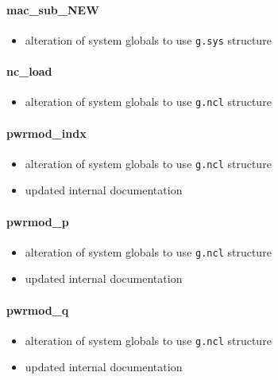 \documentclass[12pt]{article}
\begin{document}
\paragraph{mac\_sub\_NEW}
	\begin{itemize}
		\item alteration of system globals to use \verb|g.sys| structure
	\end{itemize}
\paragraph{nc\_load}
	\begin{itemize}
		\item alteration of system globals to use \verb|g.ncl| structure
	\end{itemize}
\paragraph{pwrmod\_indx}
	\begin{itemize}
		\item alteration of system globals to use \verb|g.ncl| structure
		\item updated internal documentation
	\end{itemize}
\paragraph{pwrmod\_p}
	\begin{itemize}
		\item alteration of system globals to use \verb|g.ncl| structure
		\item updated internal documentation
	\end{itemize}
\paragraph{pwrmod\_q}
	\begin{itemize}
		\item alteration of system globals to use \verb|g.ncl| structure
		\item updated internal documentation
	\end{itemize}
\end{document}
